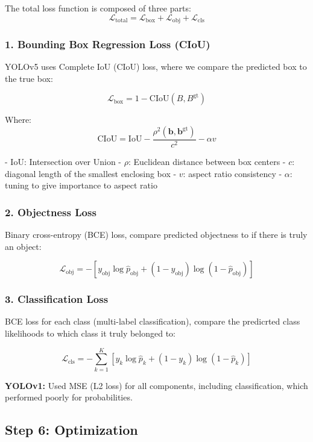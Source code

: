 \documentclass[11pt]{article}
\begin{document}
The total loss function is composed of three parts:
\[
\mathcal{L}_{\text{total}} = \mathcal{L}_{\text{box}} + \mathcal{L}_{\text{obj}} + \mathcal{L}_{\text{cls}}
\]

\subsubsection*{1. Bounding Box Regression Loss (CIoU)}

YOLOv5 uses Complete IoU (CIoU) loss, where we compare the predicted box to the true box:

\[
\mathcal{L}_{\text{box}} = 1 - \text{CIoU}(B, B^{\text{gt}})
\]

Where:
\[
\text{CIoU} = \text{IoU} - \frac{\rho^2(\mathbf{b}, \mathbf{b}^{\text{gt}})}{c^2} - \alpha v
\] \cite{zheng2020distanceiou}

- $\text{IoU}$: Intersection over Union  
- $\rho$: Euclidean distance between box centers  
- $c$: diagonal length of the smallest enclosing box  
- $v$: aspect ratio consistency  
- $\alpha$: tuning to give importance to aspect ratio

\subsubsection*{2. Objectness Loss}

Binary cross-entropy (BCE) loss, compare predicted objectness to if there is truly an object:

\[
\mathcal{L}_{\text{obj}} = - \left[ y_{\text{obj}} \log \hat{p}_{\text{obj}} + (1 - y_{\text{obj}}) \log (1 - \hat{p}_{\text{obj}}) \right]
\] \cite{zheng2020distanceiou}

\subsubsection*{3. Classification Loss}

BCE loss for each class (multi-label classification), compare the predicrted class likelihoods to which class it truly belonged to:

\[
\mathcal{L}_{\text{cls}} = - \sum_{k=1}^{K} \left[ y_k \log \hat{p}_k + (1 - y_k) \log (1 - \hat{p}_k) \right]
\] \cite{zheng2020distanceiou}

\textbf{YOLOv1:} Used MSE (L2 loss) for all components, including classification, which performed poorly for probabilities. \cite{redmon2016you}

\subsection{Step 6: Optimization}
\end{document}
